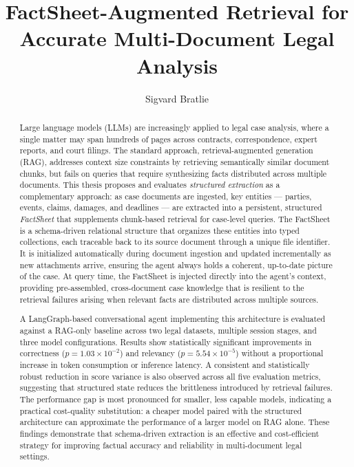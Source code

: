 \documentclass{report}
\title{FactSheet-Augmented Retrieval for Accurate Multi-Document Legal Analysis}
\author{Sigvard Bratlie}
\begin{document}
\maketitle

\tableofcontents
\newpage

\begin{abstract}
Large language models (LLMs) are increasingly applied to legal case analysis, where a single matter may span hundreds of pages across contracts, correspondence, expert reports, and court filings. The standard approach, retrieval-augmented generation (RAG), addresses context size constraints by retrieving semantically similar document chunks, but fails on queries that require synthesizing facts distributed across multiple documents. This thesis proposes and evaluates \textit{structured extraction} as a complementary approach: as case documents are ingested, key entities --- parties, events, claims, damages, and deadlines --- are extracted into a persistent, structured \textit{FactSheet} that supplements chunk-based retrieval for case-level queries.
The FactSheet is a schema-driven relational structure that organizes these entities into typed collections, each traceable back to its source document through a unique file identifier.
It is initialized automatically during document ingestion and updated incrementally as new attachments arrive, ensuring the agent always holds a coherent, up-to-date picture of the case.
At query time, the FactSheet is injected directly into the agent's context, providing pre-assembled, cross-document case knowledge that is resilient to the retrieval failures arising when relevant facts are distributed across multiple sources.

A LangGraph-based conversational agent implementing this architecture is evaluated against a RAG-only baseline across two legal datasets, multiple session stages, and three model configurations. Results show statistically significant improvements in correctness ($p = 1.03 \times 10^{-2}$) and relevancy ($p = 5.54 \times 10^{-5}$) without a proportional increase in token consumption or inference latency. A consistent and statistically robust reduction in score variance is also observed across all five evaluation metrics, suggesting that structured state reduces the brittleness introduced by retrieval failures. The performance gap is most pronounced for smaller, less capable models, indicating a practical cost-quality substitution: a cheaper model paired with the structured architecture can approximate the performance of a larger model on RAG alone. These findings demonstrate that schema-driven extraction is an effective and cost-efficient strategy for improving factual accuracy and reliability in multi-document legal settings.
\end{abstract}















\end{document}
